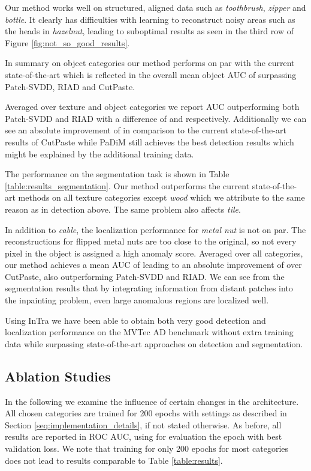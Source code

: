 \documentclass[final,5p,times,twocolumn]{elsarticle}
\begin{document}
	Our method works well on structured, aligned data such as \textit{toothbrush}, \textit{zipper} and \textit{bottle}. It clearly has difficulties with learning to reconstruct noisy areas such as the heads in \textit{hazelnut}, leading to suboptimal results as seen in the third row of Figure \ref{fig:not_so_good_results}.
	
	In summary on object categories our method performs on par with the current state-of-the-art which is reflected in the overall mean object AUC of  surpassing Patch-SVDD, RIAD and CutPaste.
	
	Averaged over texture and object categories we report  AUC outperforming both Patch-SVDD and RIAD with a difference of  and  respectively.  
	Additionally we can see an absolute improvement of  in comparison to the current state-of-the-art results of CutPaste while PaDiM still achieves the best detection results which might be explained by the additional training data. 
	


	
	The performance on the segmentation task is shown in Table \ref{table:results_segmentation}.
	Our method outperforms the current state-of-the-art methods on all texture categories except \textit{wood} which we attribute to the same reason as in detection above. The same problem also affects \textit{tile}. 
	
	In addition to \textit{cable}, the localization performance for \textit{metal nut} is not on par. The reconstructions for flipped metal nuts are too close to the original, so not every pixel in the object is assigned a high anomaly score.
	Averaged over all categories, our method achieves a mean AUC of  leading to an absolute improvement of  over CutPaste, also outperforming Patch-SVDD and RIAD.
	We can see from the segmentation results that by integrating information from distant patches into the inpainting problem, even large anomalous regions are localized well. 
	
	Using InTra we have been able to obtain both very good detection and localization performance on the MVTec AD benchmark without extra training data while surpassing state-of-the-art approaches on detection and segmentation.
	
	
	\subsection{Ablation Studies}
	
	In the following we examine the influence of certain changes in the architecture. All chosen categories are trained for 200 epochs with settings as described in Section \ref{seq:implementation_details}, if not stated otherwise. As before, all results are reported in ROC AUC, using for evaluation the epoch with best validation loss. We note that training for only 200 epochs for most categories does not lead to results comparable to Table \ref{table:results}.  
	
\end{document}
